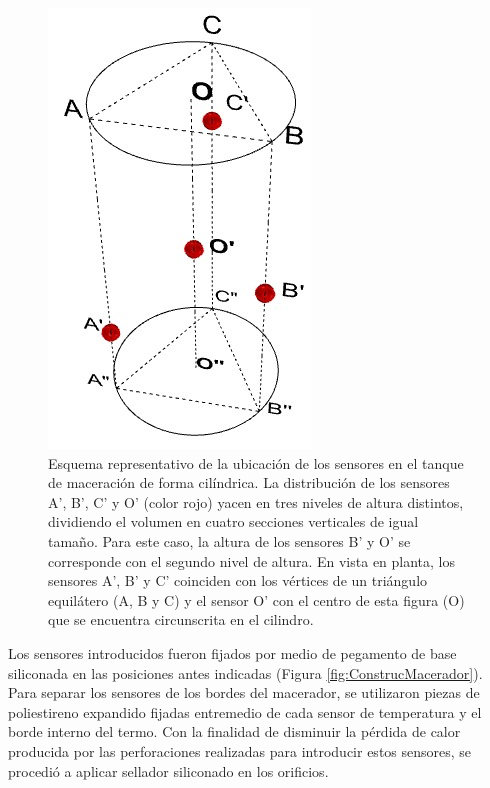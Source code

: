         \begin{figure}[h]
            \centering
            \includegraphics[scale=0.5]{Pruebas/UbicacionSensoresEnTanque-04.jpeg}
            \caption{Esquema representativo de la ubicación de los sensores en el tanque de maceración de forma cilíndrica. La distribución de los sensores A', B', C' y O' (color rojo) yacen en tres niveles de altura distintos, dividiendo el volumen en cuatro secciones verticales de igual tamaño. Para este caso, la altura de los sensores B' y O' se corresponde con el segundo nivel de altura. En vista en planta, los sensores A', B' y C' coinciden con los vértices de un triángulo equilátero (A, B y C) y el sensor O' con el centro de esta figura (O) que se encuentra circunscrita en el cilindro.}
            \label{fig:SensoresEnTanque}
        \end{figure}
        
        \par Los sensores introducidos fueron fijados por medio de pegamento de base siliconada en las posiciones antes indicadas (Figura \ref{fig:ConstrucMacerador}). Para separar los sensores de los bordes del macerador, se utilizaron piezas de poliestireno expandido fijadas entremedio de cada sensor de temperatura y el borde interno del termo.
        Con la finalidad de disminuir la pérdida de calor producida por las perforaciones realizadas para introducir estos sensores, se procedió a aplicar sellador siliconado  en los orificios.
        
